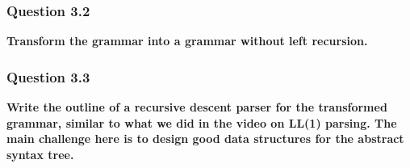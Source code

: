     
    \subsubsection{Question 3.2}
        \textbf{Transform the grammar into a grammar without left recursion.}

        

    \subsubsection{Question 3.3}
        \textbf{Write the outline of a recursive descent parser for the transformed grammar, similar to what we did in the video on LL(1) parsing. The main challenge here is to design good data structures for the abstract syntax tree.}

        